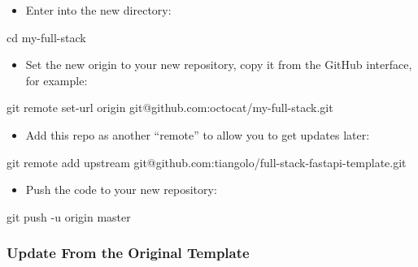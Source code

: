 \documentclass[
]{article}
\newenvironment{Shaded}{}{}
\newcommand{\AttributeTok}[1]{\textcolor[rgb]{0.49,0.56,0.16}{#1}}
\newcommand{\BuiltInTok}[1]{#1}
\newcommand{\FunctionTok}[1]{\textcolor[rgb]{0.02,0.16,0.49}{#1}}
\newcommand{\NormalTok}[1]{#1}
\providecommand{\tightlist}{%
  \setlength{\itemsep}{0pt}\setlength{\parskip}{0pt}}
\begin{document}
\begin{itemize}
\tightlist
\item
  Enter into the new directory:
\end{itemize}

\begin{Shaded}
\begin{Highlighting}[]
\BuiltInTok{cd}\NormalTok{ my{-}full{-}stack}
\end{Highlighting}
\end{Shaded}

\begin{itemize}
\tightlist
\item
  Set the new origin to your new repository, copy it from the GitHub
  interface, for example:
\end{itemize}

\begin{Shaded}
\begin{Highlighting}[]
\FunctionTok{git}\NormalTok{ remote set{-}url origin git@github.com:octocat/my{-}full{-}stack.git}
\end{Highlighting}
\end{Shaded}

\begin{itemize}
\tightlist
\item
  Add this repo as another ``remote'' to allow you to get updates later:
\end{itemize}

\begin{Shaded}
\begin{Highlighting}[]
\FunctionTok{git}\NormalTok{ remote add upstream git@github.com:tiangolo/full{-}stack{-}fastapi{-}template.git}
\end{Highlighting}
\end{Shaded}

\begin{itemize}
\tightlist
\item
  Push the code to your new repository:
\end{itemize}

\begin{Shaded}
\begin{Highlighting}[]
\FunctionTok{git}\NormalTok{ push }\AttributeTok{{-}u}\NormalTok{ origin master}
\end{Highlighting}
\end{Shaded}

\hypertarget{update-from-the-original-template}{%
\subsubsection{Update From the Original
Template}\label{update-from-the-original-template}}
\end{document}
